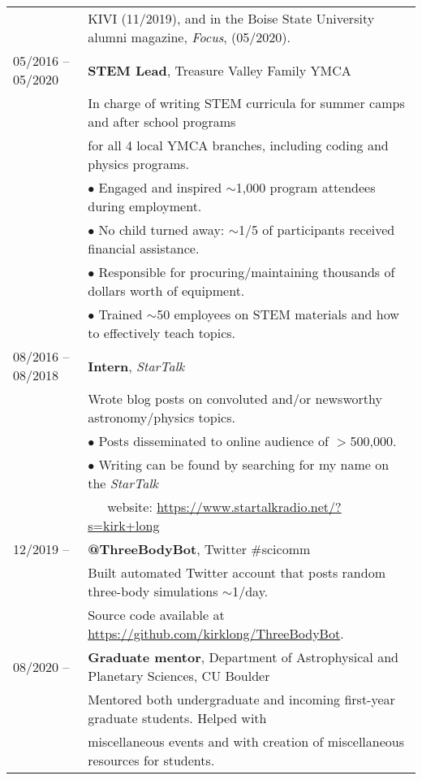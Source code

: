 \documentclass[11pt]{article}
\begin{document}
\begin{tabular}{ll}
      & KIVI (11/2019), and in the Boise State University alumni magazine, \textit{Focus}, (05/2020). \vspace{2mm} \\
05/2016 -- 05/2020   &   \textbf{STEM Lead}, Treasure Valley Family YMCA \vspace{1mm} \\
      & In charge of writing STEM curricula for summer camps and after school programs \\
      & for all 4 local YMCA branches, including coding and physics programs. \vspace{0.5mm}\\
      & $\bullet$ Engaged and inspired $\sim$1,000 program attendees during employment. \\
      & $\bullet$ No child turned away: $\sim$1/5 of participants received financial assistance. \\
      & $\bullet$ Responsible for procuring/maintaining thousands of dollars worth of equipment. \\
      & $\bullet$ Trained $\sim$50 employees on STEM materials and how to effectively teach topics. \vspace{2mm} \\
08/2016 -- 08/2018    &   \textbf{Intern}, \textit{StarTalk} \vspace{1mm} \\
      & Wrote blog posts on convoluted and/or newsworthy astronomy/physics topics. \\
      & $\bullet$ Posts disseminated to online audience of $>$500,000. \\
      & $\bullet$ Writing can be found by searching for my name on the \textit{StarTalk} \\
      & \-\ \-\ \-\ website: \url{https://www.startalkradio.net/?s=kirk+long} \vspace{2mm}\\
12/2019 --    &   \textbf{@ThreeBodyBot}, Twitter \#scicomm \vspace{1mm} \\
      & Built automated Twitter account that posts random three-body simulations $\sim$1/day. \\
      & Source code available at \url{https://github.com/kirklong/ThreeBodyBot}. \vspace{2mm}\\
08/2020 --    &   \textbf{Graduate mentor}, Department of Astrophysical and Planetary Sciences, CU Boulder \vspace{1mm} \\
      & Mentored both undergraduate and incoming first-year graduate students. Helped with \\
      & miscellaneous events and with creation of miscellaneous resources for students. \\
\end{tabular}
\end{document}
